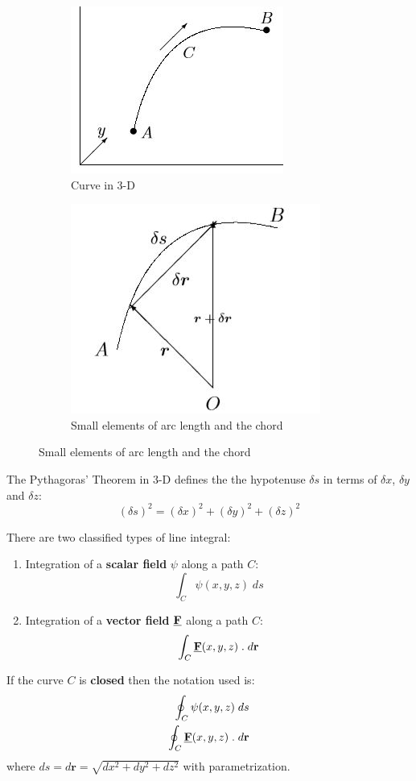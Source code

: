 \documentclass[10pt,a4paper]{article}
\begin{document}
\begin{figure} [h]
\centering
\begin{subfigure}{.5\textwidth}
  \centering
  \includegraphics[width=.4\linewidth]{Line1.JPG}
  \caption{Curve in 3-D}
  \label{fig:sub1}
\end{subfigure}%
\begin{subfigure}{.5\textwidth}
  \centering
  \includegraphics[width=.4\linewidth]{Line2.JPG}
  \caption{Small elements of arc length and the chord}
  \label{fig:sub2}
\end{subfigure}
\label{fig:test}
\end{figure}

The Pythagoras' Theorem in 3-D defines the the hypotenuse $\delta s$ in terms of $\delta x$, $\delta y$ and $\delta z$:
$$
    (\delta s)^2 = (\delta x)^2 + (\delta y)^2 + (\delta z)^2
$$

There are two classified types of line integral:
\begin{enumerate}
    \item Integration of a \textbf{scalar field} $\psi$ along a path $C$:
    $$
        \int_C \psi(x,y,z)\; ds
    $$

    \item Integration of a \textbf{vector field} $\textbf{\underline{F}}$ along a path $C$:
    $$
        \int_C \textbf{\underline{F}}(x,y,z)\; . \; d \textbf{r}
    $$
\end{enumerate}

\begin{tcolorbox}[breakable,colback=white]
If the curve $C$ is \textbf{closed} then the notation used is:
\begin{align*}
    \oint_C \psi(x,y,z)\; ds \\
    \oint_C \textbf{\underline{F}}(x,y,z)\; . \; d \textbf{r}
\end{align*}
where $ds = d\textbf{r} = \sqrt{dx^2+dy^2+dz^2}$ with parametrization.
\end{tcolorbox}
\end{document}
